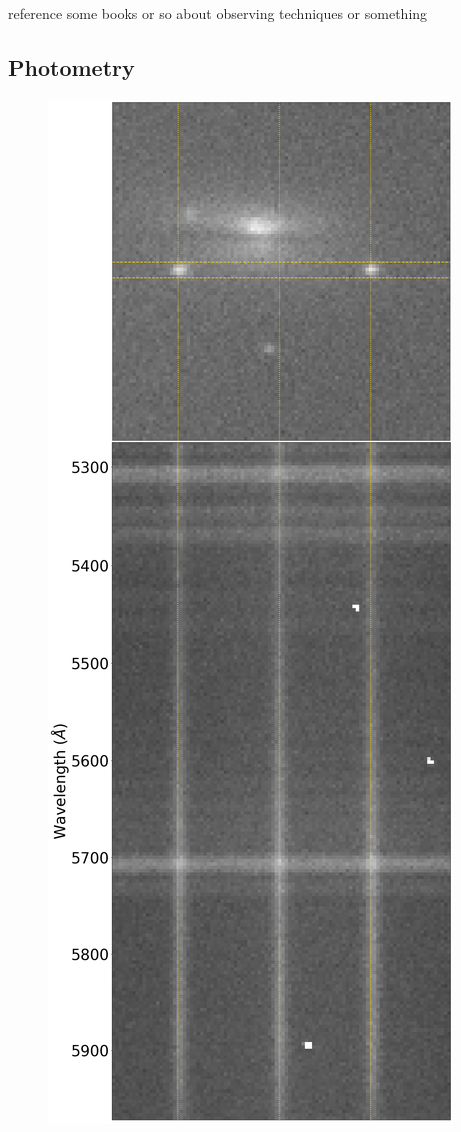 \documentclass[a4paper,oneside,12pt, class=Latex/Classes/PhDthesisPSnPDF, crop=false]{standalone}
\begin{document}
\color{red} reference some books or so about observing techniques or something \color{black}


\subsection{Photometry}
\begin{figure}
    \centering
    \includegraphics[height=0.8\textheight]{../Images/chapter_2/phot_and_spec_example.png}

\end{figure}
\end{document}
